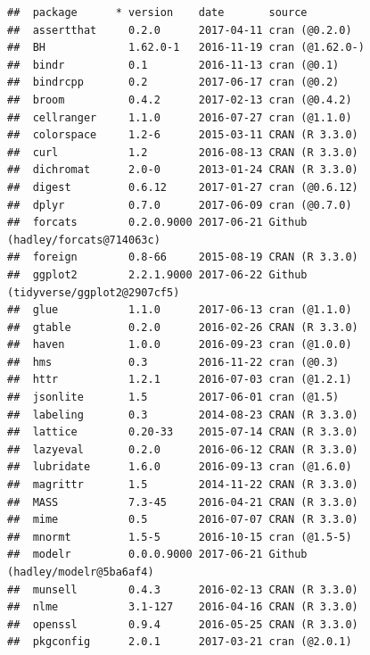 \documentclass[]{book}
\theoremstyle{definition}
\theoremstyle{definition}
\theoremstyle{remark}
\begin{document}
\begin{verbatim}
##  package      * version    date       source                            
##  assertthat     0.2.0      2017-04-11 cran (@0.2.0)                     
##  BH             1.62.0-1   2016-11-19 cran (@1.62.0-)                   
##  bindr          0.1        2016-11-13 cran (@0.1)                       
##  bindrcpp       0.2        2017-06-17 cran (@0.2)                       
##  broom          0.4.2      2017-02-13 cran (@0.4.2)                     
##  cellranger     1.1.0      2016-07-27 cran (@1.1.0)                     
##  colorspace     1.2-6      2015-03-11 CRAN (R 3.3.0)                    
##  curl           1.2        2016-08-13 CRAN (R 3.3.0)                    
##  dichromat      2.0-0      2013-01-24 CRAN (R 3.3.0)                    
##  digest         0.6.12     2017-01-27 cran (@0.6.12)                    
##  dplyr          0.7.0      2017-06-09 cran (@0.7.0)                     
##  forcats        0.2.0.9000 2017-06-21 Github (hadley/forcats@714063c)   
##  foreign        0.8-66     2015-08-19 CRAN (R 3.3.0)                    
##  ggplot2        2.2.1.9000 2017-06-22 Github (tidyverse/ggplot2@2907cf5)
##  glue           1.1.0      2017-06-13 cran (@1.1.0)                     
##  gtable         0.2.0      2016-02-26 CRAN (R 3.3.0)                    
##  haven          1.0.0      2016-09-23 cran (@1.0.0)                     
##  hms            0.3        2016-11-22 cran (@0.3)                       
##  httr           1.2.1      2016-07-03 cran (@1.2.1)                     
##  jsonlite       1.5        2017-06-01 cran (@1.5)                       
##  labeling       0.3        2014-08-23 CRAN (R 3.3.0)                    
##  lattice        0.20-33    2015-07-14 CRAN (R 3.3.0)                    
##  lazyeval       0.2.0      2016-06-12 CRAN (R 3.3.0)                    
##  lubridate      1.6.0      2016-09-13 cran (@1.6.0)                     
##  magrittr       1.5        2014-11-22 CRAN (R 3.3.0)                    
##  MASS           7.3-45     2016-04-21 CRAN (R 3.3.0)                    
##  mime           0.5        2016-07-07 CRAN (R 3.3.0)                    
##  mnormt         1.5-5      2016-10-15 cran (@1.5-5)                     
##  modelr         0.0.0.9000 2017-06-21 Github (hadley/modelr@5ba6af4)    
##  munsell        0.4.3      2016-02-13 CRAN (R 3.3.0)                    
##  nlme           3.1-127    2016-04-16 CRAN (R 3.3.0)                    
##  openssl        0.9.4      2016-05-25 CRAN (R 3.3.0)                    
##  pkgconfig      2.0.1      2017-03-21 cran (@2.0.1)                     

\end{verbatim}
\end{document}
